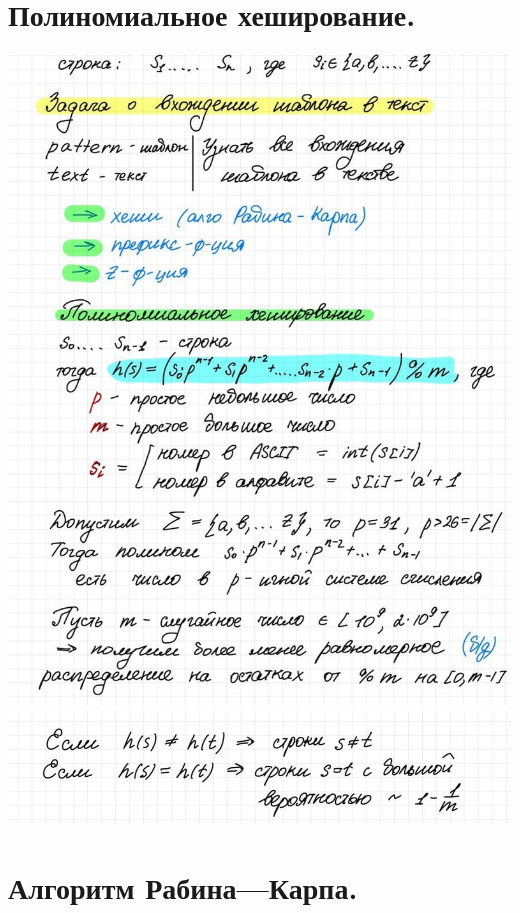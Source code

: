 \section{Полиномиальное хеширование.}
\includegraphics[width=1\linewidth]{images/hashing1.jpg}
\includegraphics[width=1\linewidth]{images/hashing2.jpg}
\newpage{}

\section{Алгоритм Рабина—Карпа.}

